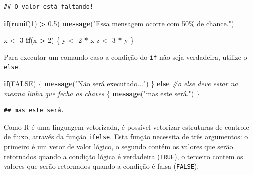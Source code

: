 \documentclass[
]{book}
\newenvironment{Shaded}{\begin{snugshade}}{\end{snugshade}}
\newcommand{\CommentTok}[1]{\textcolor[rgb]{0.56,0.35,0.01}{\textit{#1}}}
\newcommand{\ConstantTok}[1]{\textcolor[rgb]{0.56,0.35,0.01}{#1}}
\newcommand{\ControlFlowTok}[1]{\textcolor[rgb]{0.13,0.29,0.53}{\textbf{#1}}}
\newcommand{\DecValTok}[1]{\textcolor[rgb]{0.00,0.00,0.81}{#1}}
\newcommand{\FloatTok}[1]{\textcolor[rgb]{0.00,0.00,0.81}{#1}}
\newcommand{\FunctionTok}[1]{\textcolor[rgb]{0.13,0.29,0.53}{\textbf{#1}}}
\newcommand{\NormalTok}[1]{#1}
\newcommand{\OtherTok}[1]{\textcolor[rgb]{0.56,0.35,0.01}{#1}}
\newcommand{\SpecialCharTok}[1]{\textcolor[rgb]{0.81,0.36,0.00}{\textbf{#1}}}
\newcommand{\StringTok}[1]{\textcolor[rgb]{0.31,0.60,0.02}{#1}}
\begin{document}
\begin{verbatim}
## O valor está faltando!
\end{verbatim}

\begin{Shaded}
\begin{Highlighting}[]
\ControlFlowTok{if}\NormalTok{(}\FunctionTok{runif}\NormalTok{(}\DecValTok{1}\NormalTok{) }\SpecialCharTok{\textgreater{}} \FloatTok{0.5}\NormalTok{) }\FunctionTok{message}\NormalTok{(}\StringTok{"Essa mensagem ocorre com 50\% de chance."}\NormalTok{)}

\NormalTok{x }\OtherTok{\textless{}{-}} \DecValTok{3}
\ControlFlowTok{if}\NormalTok{(x }\SpecialCharTok{\textgreater{}} \DecValTok{2}\NormalTok{) \{}
\NormalTok{  y }\OtherTok{\textless{}{-}} \DecValTok{2} \SpecialCharTok{*}\NormalTok{ x}
\NormalTok{  z }\OtherTok{\textless{}{-}} \DecValTok{3} \SpecialCharTok{*}\NormalTok{ y }
\NormalTok{\}}
\end{Highlighting}
\end{Shaded}

Para executar um comando caso a condição do \texttt{if} não seja verdadeira, utilize o \texttt{else}.

\begin{Shaded}
\begin{Highlighting}[]
\ControlFlowTok{if}\NormalTok{(}\ConstantTok{FALSE}\NormalTok{)}
\NormalTok{\{}
   \FunctionTok{message}\NormalTok{(}\StringTok{"Não será executado..."}\NormalTok{)}
\NormalTok{\} }\ControlFlowTok{else} \CommentTok{\#o else deve estar na mesma linha que fecha as chaves}
\NormalTok{\{}
   \FunctionTok{message}\NormalTok{(}\StringTok{"mas este será."}\NormalTok{)}
\NormalTok{\}}
\end{Highlighting}
\end{Shaded}

\begin{verbatim}
## mas este será.
\end{verbatim}

Como R é uma linguagem vetorizada, é possível vetorizar estruturas de controle de fluxo, através da função \texttt{ifelse}.
Esta função necessita de três argumentos: o primeiro é um vetor de valor lógico, o segundo contém os valores que serão retornados quando a condição lógica é verdadeira (\texttt{TRUE}), o terceiro contem os valores que serão retornados quando a condição é falsa (\texttt{FALSE}).
\end{document}
